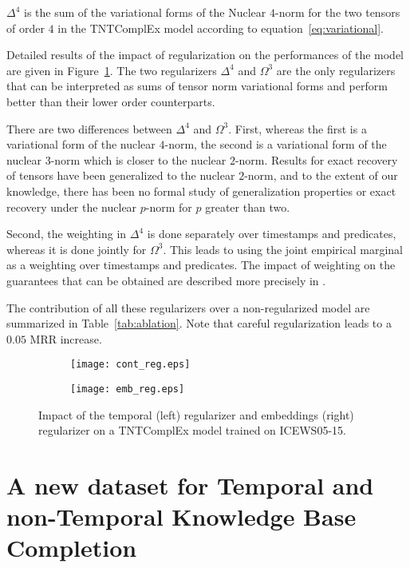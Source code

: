 \documentclass{article}
\begin{document}
$\Delta^4$ is the sum of the variational forms of the Nuclear $4$-norm for the two tensors of order $4$ in the TNTComplEx model according to equation~\eqref{eq:variational}.

Detailed results of the impact of regularization on the performances of the model are given in Figure~\ref{fig:ablation}. The two regularizers $\Delta^4$ and $\Omega^3$ are the only regularizers that can be interpreted as sums of tensor norm variational forms and perform better than their lower order counterparts.

There are two differences between $\Delta^4$ and $\Omega^3$. First, whereas the first is a variational form of the nuclear $4$-norm, the second is a variational form of the nuclear $3$-norm which is closer to the nuclear $2$-norm. Results for exact recovery of tensors have been generalized to the nuclear $2$-norm, and to the extent of our knowledge, there has been no formal study of generalization properties or exact recovery under the nuclear $p$-norm for $p$ greater than two. 

Second, the weighting in $\Delta^4$ is done separately over timestamps and predicates, whereas it is done jointly for $\Omega^3$. This leads to using the joint empirical marginal as a weighting over timestamps and predicates. The impact of weighting on the guarantees that can be obtained are described more precisely in \citet{foygel_learning_2011}.

The contribution of all these regularizers over a non-regularized model are summarized in Table~\ref{tab:ablation}. Note that careful regularization leads to a $0.05$ MRR increase.

\begin{figure}[t]
\centering
    \begin{subfigure}[b]{0.48\textwidth}
      \centering \texttt{[image: cont\_reg.eps]}
    \end{subfigure}
    \hfill
    \begin{subfigure}[b]{0.48\textwidth}
      \centering \texttt{[image: emb\_reg.eps]}
    \end{subfigure}
    \caption{Impact of the temporal (left) regularizer and embeddings (right) regularizer on a TNTComplEx model trained on ICEWS05-15. 
}
    \label{fig:ablation}
\end{figure}




\section{A new dataset for Temporal and non-Temporal Knowledge Base Completion}
\end{document}
